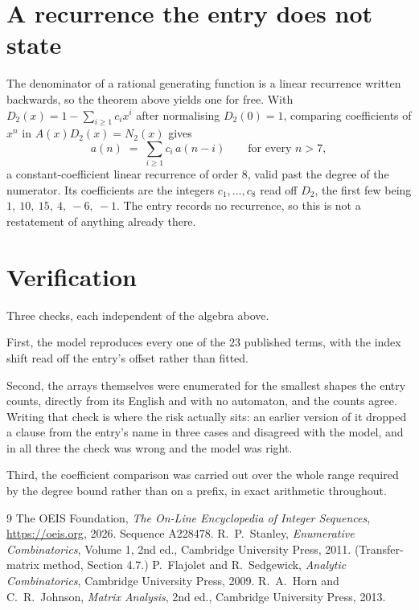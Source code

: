 \documentclass[11pt,a4paper]{article}
\theoremstyle{plain}
\theoremstyle{definition}
\begin{document}
\section{A recurrence the entry does not state}

The denominator of a rational generating function is a linear recurrence written backwards, so
the theorem above yields one for free. With $D_2(x)=1-\sum_{i\ge1}c_ix^i$ after normalising
$D_2(0)=1$, comparing coefficients of $x^n$ in $A(x)D_2(x)=N_2(x)$ gives
\[
a(n)\;=\;\sum_{i\ge1}c_i\,a(n-i)\qquad\text{for every }n>7,
\]
a constant-coefficient linear recurrence of order $8$, valid past the degree of the
numerator. Its coefficients are the integers $c_1,\dots,c_{8}$ read off $D_2$, the first few being $1,\ 10,\ 15,\ 4,\ -6,\ -1$. The entry records no recurrence, so this is not a restatement of anything
already there.

\section{Verification}

Three checks, each independent of the algebra above.

First, the model reproduces every one of the $23$ published terms, with the index shift
read off the entry's offset rather than fitted.

Second, the arrays themselves were enumerated for the smallest shapes the entry counts,
directly from its English and with no automaton, and the counts agree. Writing that check is
where the risk actually sits: an earlier version of it dropped a clause from the entry's name
in three cases and disagreed with the model, and in all three the check was wrong and the model
was right.

Third, the coefficient comparison was carried out over the whole range required by the degree
bound rather than on a prefix, in exact arithmetic throughout.

\begin{thebibliography}{9}
 The OEIS Foundation, \emph{The On-Line Encyclopedia of Integer
Sequences}, \url{https://oeis.org}, 2026. Sequence A228478.
 R.~P.~Stanley, \emph{Enumerative Combinatorics}, Volume 1, 2nd ed.,
Cambridge University Press, 2011. (Transfer-matrix method, Section 4.7.)
 P.~Flajolet and R.~Sedgewick, \emph{Analytic Combinatorics}, Cambridge
University Press, 2009.
 R.~A.~Horn and C.~R.~Johnson, \emph{Matrix Analysis}, 2nd ed., Cambridge
University Press, 2013.
\end{thebibliography}
\end{document}
